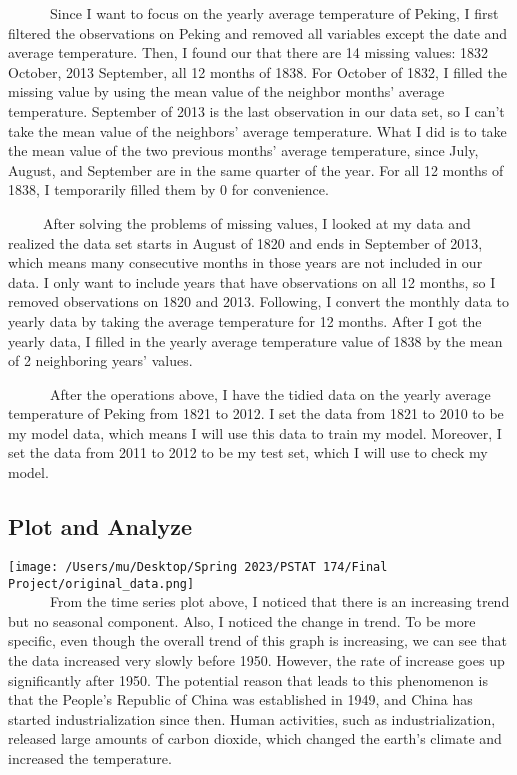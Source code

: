 \documentclass[
]{article}
\begin{document}
~~~~~~Since I want to focus on the yearly average temperature of Peking,
I first filtered the observations on Peking and removed all variables
except the date and average temperature. Then, I found our that there
are 14 missing values: 1832 October, 2013 September, all 12 months of
1838. For October of 1832, I filled the missing value by using the mean
value of the neighbor months' average temperature. September of 2013 is
the last observation in our data set, so I can't take the mean value of
the neighbors' average temperature. What I did is to take the mean value
of the two previous months' average temperature, since July, August, and
September are in the same quarter of the year. For all 12 months of
1838, I temporarily filled them by 0 for convenience.

~~~~~After solving the problems of missing values, I looked at my data
and realized the data set starts in August of 1820 and ends in September
of 2013, which means many consecutive months in those years are not
included in our data. I only want to include years that have
observations on all 12 months, so I removed observations on 1820 and
2013. Following, I convert the monthly data to yearly data by taking the
average temperature for 12 months. After I got the yearly data, I filled
in the yearly average temperature value of 1838 by the mean of 2
neighboring years' values.

~~~~~~After the operations above, I have the tidied data on the yearly
average temperature of Peking from 1821 to 2012. I set the data from
1821 to 2010 to be my model data, which means I will use this data to
train my model. Moreover, I set the data from 2011 to 2012 to be my test
set, which I will use to check my model.

\hypertarget{plot-and-analyze}{%
\subsection{Plot and Analyze}\label{plot-and-analyze}}

\texttt{[image: /Users/mu/Desktop/Spring 2023/PSTAT 174/Final Project/original\_data.png]}\\

~~~~~~From the time series plot above, I noticed that there is an
increasing trend but no seasonal component. Also, I noticed the change
in trend. To be more specific, even though the overall trend of this
graph is increasing, we can see that the data increased very slowly
before 1950. However, the rate of increase goes up significantly after
1950. The potential reason that leads to this phenomenon is that the
People's Republic of China was established in 1949, and China has
started industrialization since then. Human activities, such as
industrialization, released large amounts of carbon dioxide, which
changed the earth's climate and increased the temperature.
\end{document}
